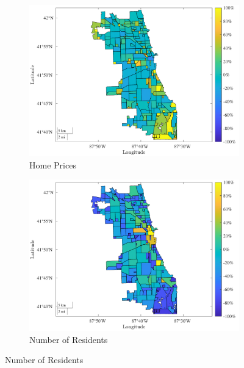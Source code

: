 \documentclass[12pt]{article}
\begin{document}
\begin{figure}[h!]
\centering
    \caption{Home Prices and Residents}
    \begin{subfigure}{0.75\textwidth}
         \centering
         \caption{Home Prices}
         \includegraphics[width=\textwidth]{Pset1/Figures/Single Agent/Counterfactual/Fix Population/housing.pdf}
    \end{subfigure}  
    \begin{subfigure}{0.75\textwidth}
         \centering
         \caption{Number of Residents}
         \includegraphics[width=\linewidth]{Pset1/Figures/Single Agent/Counterfactual/Fix Population/residents.pdf}
    \end{subfigure}
    \label{fig:pop_house_res}
\end{figure}
\end{document}
